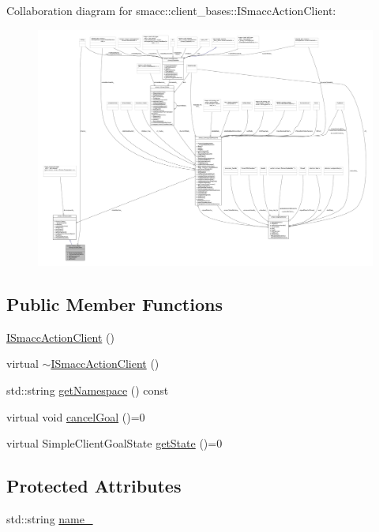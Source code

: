 Collaboration diagram for smacc\+:\+:client\+\_\+bases\+:\+:I\+Smacc\+Action\+Client\+:
\nopagebreak
\begin{figure}[H]
\begin{center}
\leavevmode
\includegraphics[width=350pt]{classsmacc_1_1client__bases_1_1ISmaccActionClient__coll__graph}
\end{center}
\end{figure}
\subsection*{Public Member Functions}
\begin{DoxyCompactItemize}
\item 
\hyperlink{classsmacc_1_1client__bases_1_1ISmaccActionClient_a379f2672d1b971422821026ca90eb96a}{I\+Smacc\+Action\+Client} ()
\item 
virtual \hyperlink{classsmacc_1_1client__bases_1_1ISmaccActionClient_a258324a60e2939b3fef3cb9b4b1730e5}{$\sim$\+I\+Smacc\+Action\+Client} ()
\item 
std\+::string \hyperlink{classsmacc_1_1client__bases_1_1ISmaccActionClient_ab6185745af5f3d060eb7401fd02a2ecc}{get\+Namespace} () const 
\item 
virtual void \hyperlink{classsmacc_1_1client__bases_1_1ISmaccActionClient_ac4880d5bb0e8a343d323a6c46984476d}{cancel\+Goal} ()=0
\item 
virtual Simple\+Client\+Goal\+State \hyperlink{classsmacc_1_1client__bases_1_1ISmaccActionClient_a7380270966cec25f03ec288c747a2d7e}{get\+State} ()=0
\end{DoxyCompactItemize}
\subsection*{Protected Attributes}
\begin{DoxyCompactItemize}
\item 
std\+::string \hyperlink{classsmacc_1_1client__bases_1_1ISmaccActionClient_a74c660a4c111a3b8858b9b7b1cedc866}{name\+\_\+}
\end{DoxyCompactItemize}
